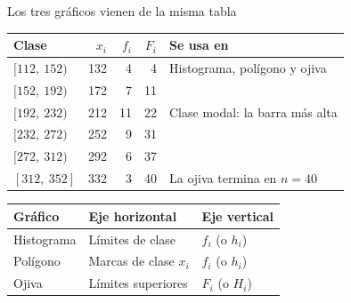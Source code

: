 \documentclass[aspectratio=169,10pt]{beamer}
\begin{document}
\begin{frame}{Los tres gráficos vienen de la misma tabla}
  \scriptsize
  \begin{center}
  \begin{tabular}{@{}lrrrl@{}}
    \toprule
    \textbf{Clase} & \textbf{$x_i$} & \textbf{$f_i$} & \textbf{$F_i$} &
    \textbf{Se usa en} \\
    \midrule
    $[112,\ 152)$ & 132 &  4 &  4 & Histograma, polígono y ojiva \\
    $[152,\ 192)$ & 172 &  7 & 11 & \\
    $[192,\ 232)$ & 212 & 11 & 22 & Clase modal: la barra más alta \\
    $[232,\ 272)$ & 252 &  9 & 31 & \\
    $[272,\ 312)$ & 292 &  6 & 37 & \\
    $[312,\ 352]$ & 332 &  3 & 40 & La ojiva termina en $n=40$ \\
    \bottomrule
  \end{tabular}
  \end{center}

  \vspace{0.05cm}
  \begin{center}\scriptsize
  \begin{tabular}{@{}lll@{}}
    \toprule
    \textbf{Gráfico} & \textbf{Eje horizontal} & \textbf{Eje vertical} \\
    \midrule
    Histograma & Límites de clase & $f_i$ (o $h_i$) \\
    Polígono   & Marcas de clase $x_i$ & $f_i$ (o $h_i$) \\
    Ojiva      & Límites superiores & $F_i$ (o $H_i$) \\
    \bottomrule
  \end{tabular}
  \end{center}
\end{frame}
\end{document}
